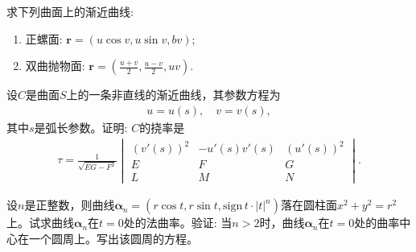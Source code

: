 \documentclass[../../main.tex]{subfiles}%
\begin{document}
\begin{example}
求下列曲面上的渐近曲线:
\begin{enumerate}[(1)]
\item 正螺面: $\boldsymbol{r} = (u\cos v,u\sin v,bv)$;
\item 双曲抛物面: $\boldsymbol{r} = \left( \frac{u+v}{2},\frac{u-v}{2},uv \right)$.
\end{enumerate}
\end{example}

\begin{example}
设$C$是曲面$S$上的一条非直线的渐近曲线，其参数方程为
\begin{align*}
u = u(s),\quad v = v(s),
\end{align*}
其中$s$是弧长参数。证明: $C$的挠率是
\begin{align*}
\tau = \frac{1}{\sqrt{EG-F^2}}
\begin{vmatrix}
(v'(s))^2 & -u'(s)v'(s) & (u'(s))^2 \\
E & F & G \\
L & M & N
\end{vmatrix}.
\end{align*}
\end{example}

\begin{example}
设$n$是正整数，则曲线$\boldsymbol{\alpha}_n = (r\cos t,r\sin t,\mathrm{sign}\,t\cdot|t|^n)$落在圆柱面$x^2 + y^2 = r^2$上。试求曲线$\boldsymbol{\alpha}_n$在$t=0$处的法曲率。验证: 当$n>2$时，曲线$\boldsymbol{\alpha}_n$在$t=0$处的曲率中心在一个圆周上。写出该圆周的方程。
\end{example}
\end{document}
